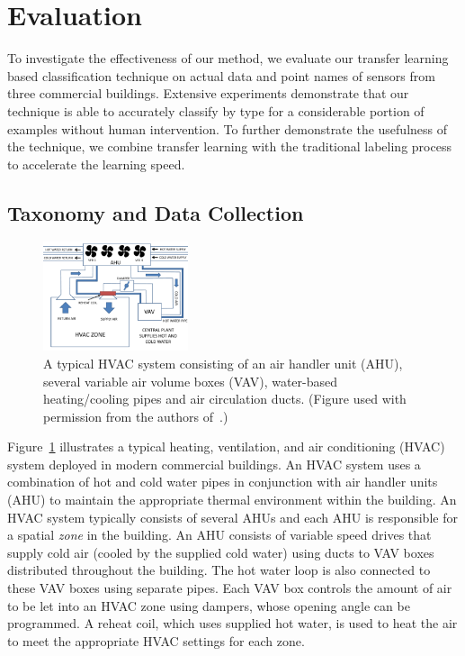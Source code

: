 \section{Evaluation}
To investigate the effectiveness of our method, we evaluate our transfer learning based classification technique on actual data and point names of sensors from three commercial buildings. Extensive experiments demonstrate that our technique is able to accurately classify by type for a considerable portion of examples without human intervention. 
To further demonstrate the usefulness of the technique, we combine transfer learning with the traditional labeling process to accelerate the learning speed.


\subsection{Taxonomy and Data Collection}
\begin{figure}[t]
\centering
\includegraphics[width=0.38\textwidth]{./fig/hvac}
\caption{A typical HVAC system consisting of an air handler unit (AHU), several variable air volume boxes (VAV), water-based heating/cooling pipes and air circulation ducts. (Figure used with permission from the authors of~\cite{sentinel}.)}
\label{fig:hvac}
\end{figure}

Figure~\ref{fig:hvac} illustrates a typical heating, ventilation, and air conditioning (HVAC) system deployed in modern commercial buildings. 
An HVAC system uses a combination of hot and cold water pipes in conjunction with
air handler units (AHU) to maintain the appropriate thermal environment within the building.
An HVAC system typically consists of several AHUs and each AHU is responsible for a spatial \emph{zone}
in the building. An AHU consists of variable speed drives that supply cold air
(cooled by the supplied cold water) using ducts to VAV boxes distributed throughout the building.
The hot water loop is also connected to these VAV boxes using separate pipes. Each VAV box
controls the amount of air to be let into an HVAC zone using dampers, whose opening angle
can be programmed. A reheat coil, which uses supplied hot water, is used to heat the air to
meet the appropriate HVAC settings for each zone.


